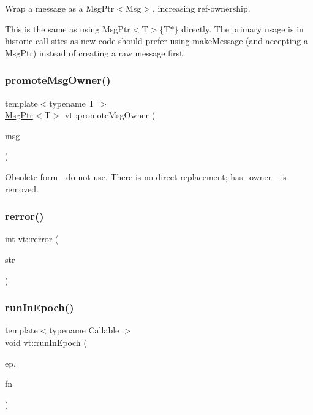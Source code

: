 Wrap a message as a Msg\+Ptr$<$\+Msg$>$, increasing ref-\/ownership. 

This is the same as using Msg\+Ptr$<$\+T$>$\{T$\ast$\} directly. The primary usage is in historic call-\/sites as new code should prefer using {\ttfamily make\+Message} (and accepting a Msg\+Ptr) instead of creating a raw message first. \mbox{\label{namespacevt_a67418c428a6a98bdc05c264ef8517dd4}} 
\subsubsection{\texorpdfstring{promote\+Msg\+Owner()}{promoteMsgOwner()}}
{\footnotesize\ttfamily template$<$typename T $>$ \\
\hyperlink{namespacevt_a9f5ebd62ee9d6dd8829e3e1cc4f858e9}{Msg\+Ptr}$<$T$>$ vt\+::promote\+Msg\+Owner (\begin{DoxyParamCaption}\item[{T $\ast$const}]{msg }\end{DoxyParamCaption})\hspace{0.3cm}{\ttfamily [inline]}}

Obsolete form -\/ do not use. There is no direct replacement; has\+\_\+owner\+\_\+ is removed. \mbox{\label{namespacevt_aff96ace008dc847d4c0f44cfa5dfb3a0}} 
\subsubsection{\texorpdfstring{rerror()}{rerror()}}
{\footnotesize\ttfamily int vt\+::rerror (\begin{DoxyParamCaption}\item[{char const $\ast$}]{str }\end{DoxyParamCaption})}

\mbox{\label{namespacevt_ab95230c4145a8f4fb6874188eda37991}} 
\subsubsection{\texorpdfstring{run\+In\+Epoch()}{runInEpoch()}}
{\footnotesize\ttfamily template$<$typename Callable $>$ \\
void vt\+::run\+In\+Epoch (\begin{DoxyParamCaption}\item[{\hyperlink{namespacevt_a985a5adf291c34a3ca263b3378388236}{Epoch\+Type}}]{ep,  }\item[{Callable \&\&}]{fn }\end{DoxyParamCaption})}

